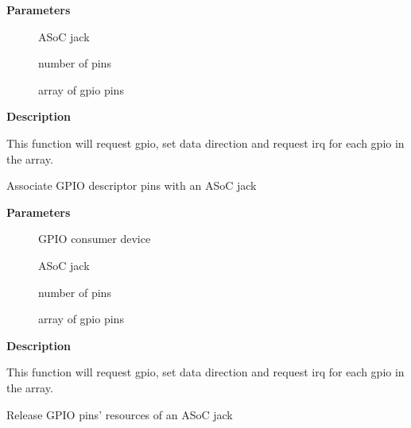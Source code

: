 \documentclass[a4paper,8pt,english]{sphinxmanual}
\begin{document}
\textbf{Parameters}
\begin{description}
\item[{}] \leavevmode
ASoC jack

\item[{}] \leavevmode
number of pins

\item[{}] \leavevmode
array of gpio pins

\end{description}

\textbf{Description}

This function will request gpio, set data direction and request irq
for each gpio in the array.

\begin{fulllineitems}
\label{sound/kernel-api/alsa-driver-api:c.snd_soc_jack_add_gpiods}
Associate GPIO descriptor pins with an ASoC jack

\end{fulllineitems}


\textbf{Parameters}
\begin{description}
\item[{}] \leavevmode
GPIO consumer device

\item[{}] \leavevmode
ASoC jack

\item[{}] \leavevmode
number of pins

\item[{}] \leavevmode
array of gpio pins

\end{description}

\textbf{Description}

This function will request gpio, set data direction and request irq
for each gpio in the array.

\begin{fulllineitems}
\label{sound/kernel-api/alsa-driver-api:c.snd_soc_jack_free_gpios}
Release GPIO pins' resources of an ASoC jack

\end{fulllineitems}
\end{document}
